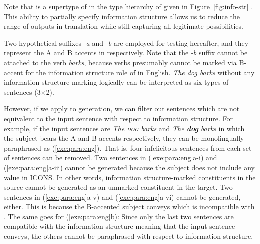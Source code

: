 \noindent Note that  is a supertype of
 in the type hierarchy of  given in
Figure~\ref{fig:info-str}
.  
This ability to partially specify information
structure allows us to reduce the range of outputs in translation
while still capturing all legitimate possibilities.



Two hypothetical suffixes \textit{-a} and \textit{-b} are employed for testing
hereafter, and they represent the A and B accents in 
\citep{bolinger:61,jackendoff:72} respectively.  Note that the \textit{-b}
suffix cannot be attached to the verb \textit{barks}, because verbs
presumably cannot be marked via B-accent for the information
structure role of  in English.  \textit{The dog barks}
without any information structure marking logically can be interpreted
as six types of sentences (3\ensuremath{\times}2).






\noindent However, if we apply  to generation, we can
filter out sentences which are not equivalent to the input sentence
with respect to information structure. For example, if the input
sentences are \textit{The \textsc{dog} barks} and \textit{The
  \textbf{dog} barks} in which the subject bears the A and B accents
respectively, they can be monolingually paraphrased as
(\ref{exe:para:eng}). That is, four infelicitous sentences from each
set of sentences can be removed.  Two sentences in
(\ref{exe:para:eng}a-i) and (\ref{exe:para:eng}a-iii) cannot be
generated because the subject does not include any value in ICONS. In
other words, information structure-marked constituents in the source
cannot be generated as an unmarked constituent in the target.  Two
sentences in (\ref{exe:para:eng}a-v) and (\ref{exe:para:eng}a-vi)
cannot be generated, either. This is because the
B-accented subject conveys  which is
incompatible with .
The same goes for (\ref{exe:para:eng}b): Since only the last two sentences are
compatible with the information structure meaning that the input
sentence conveys, the others cannot be paraphrased with respect to
information structure.





